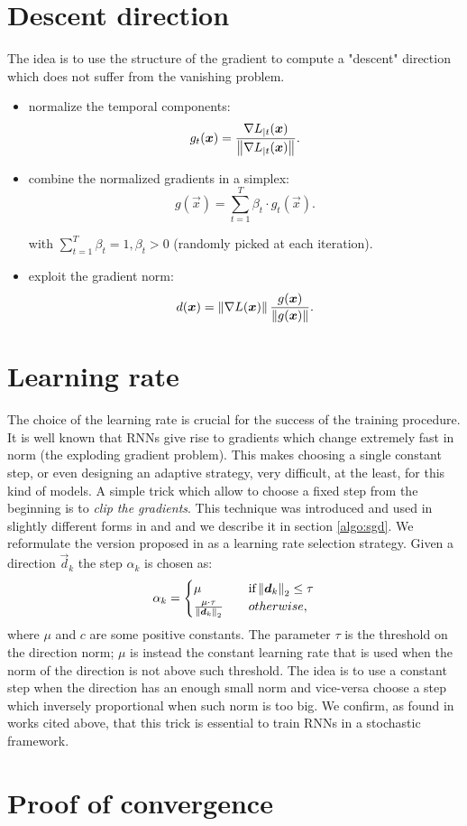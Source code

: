\section{Descent direction}

The idea is to use the structure of the gradient to compute a "descent" direction which does not suffer from the vanishing problem.
\begin{itemize}
	\item normalize the temporal components:
	\begin{equation}
	g_t(\boldsymbol{x}) = \frac{\nabla L_{|t}(\boldsymbol{x})}{\left\Vert \nabla L_{|t}(\boldsymbol{x}) \right\Vert}.
	\end{equation}
	
	\item combine the normalized gradients in a simplex:
	\begin{equation}
	g(\vec{x}) = \sum_{t=1}^T \beta_t \cdot g_t(\vec{x}).
	\end{equation}
	
	with $\sum_{t=1}^T\beta_t=1, \beta_t>0$ (randomly picked at each iteration).
	\item exploit the gradient norm:
	\begin{equation}
	d(\boldsymbol{x}) = \left\Vert \nabla L (\boldsymbol{x}) \right\Vert\frac{g(\boldsymbol{x})}{\left\Vert g(\boldsymbol{x}) \right\Vert}.
	\end{equation}
\end{itemize}
\section{Learning rate}

The choice of the learning rate is crucial for the success of the training procedure. It is well known that RNNs give rise to gradients which change extremely fast in norm (the exploding gradient problem). This makes choosing a single constant step, or even designing an adaptive strategy, very difficult, at the least, for this kind of models. A simple trick which allow to choose a fixed step from the beginning is to \textit{clip the gradients}. This technique was introduced and used in slightly different forms in \cite{understandingExplodingGradients} and \cite{clippingMikolov} and we describe it in section \ref{algo:sgd}. We reformulate the version proposed in \cite{understandingExplodingGradients} as a learning rate selection strategy.
Given a direction $\vec{d}_k$ the step $\alpha_k$ is chosen as:
\begin{equation}
\alpha_k = 
\begin{cases}
	\mu  \quad &\mbox{if} \left\Vert \boldsymbol{d}_k \right\Vert_2 \leq \tau\\
	\frac{\mu \cdot \tau}{\left\Vert \boldsymbol{d}_k \right\Vert_2} \quad & otherwise,
\end{cases}
\end{equation}
where $\mu$ and $c$ are some positive constants. The parameter $\tau$ is the threshold on the direction norm; $\mu$ is instead the constant learning rate that is used when the norm of the direction is not above such threshold. The idea is to use a constant step when the direction has an enough small norm and vice-versa choose a step which inversely proportional when such norm is too big. We confirm, as found in works cited above, that this trick is essential to train RNNs in a stochastic framework.
\section{Proof of convergence}

